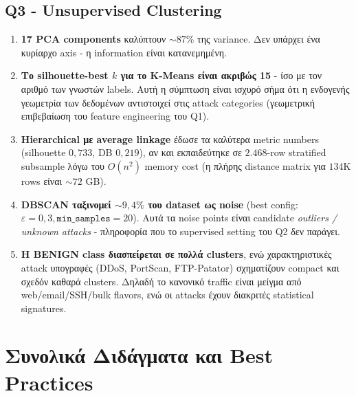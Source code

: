 \documentclass[12pt,a4paper,twoside]{book}
\begin{document}
\subsection{Q3 - Unsupervised Clustering}
\begin{enumerate}
    \item \textbf{17 PCA components} καλύπτουν \(\sim 87\%\) της variance.
    Δεν υπάρχει ένα κυρίαρχο axis - η information είναι κατανεμημένη.
    \item \textbf{Το silhouette-best \(k\) για το K-Means είναι ακριβώς 15}
    - ίσο με τον αριθμό των γνωστών labels. Αυτή η σύμπτωση είναι ισχυρό
    σήμα ότι η ενδογενής γεωμετρία των δεδομένων αντιστοιχεί στις attack
    categories (γεωμετρική επιβεβαίωση του feature engineering του Q1).
    \item \textbf{Hierarchical με average linkage} έδωσε τα καλύτερα
    metric numbers (silhouette \(0{,}733\), DB \(0{,}219\)), αν και
    εκπαιδεύτηκε σε \(2.468\)-row stratified subsample λόγω του
    \(O(n^2)\) memory cost (η πλήρης distance matrix για \(134\)K rows
    είναι \(\sim 72\) GB).
    \item \textbf{DBSCAN ταξινομεί \(\sim 9{,}4\%\) του dataset ως
    noise} (best config: \(\varepsilon=0{,}3, \texttt{min\_samples}=20\)).
    Αυτά τα noise points είναι candidate \emph{outliers / unknown
    attacks} - πληροφορία που το supervised setting του Q2 δεν παράγει.
    \item \textbf{Η BENIGN class διασπείρεται σε πολλά clusters}, ενώ
    χαρακτηριστικές attack υπογραφές (DDoS, PortScan, FTP-Patator)
    σχηματίζουν compact και σχεδόν καθαρά clusters. Δηλαδή το
    \og κανονικό\fg{} traffic είναι μείγμα από web/email/SSH/bulk
    flavors, ενώ οι attacks έχουν διακριτές statistical signatures.
\end{enumerate}

\section{Συνολικά Διδάγματα και Best Practices}
\end{document}
